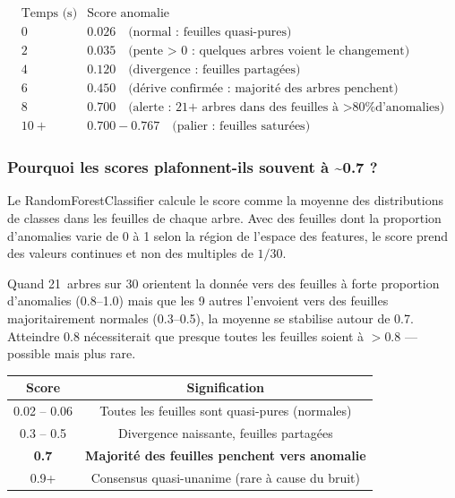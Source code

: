 \documentclass[12pt,a4paper]{article}
\begin{document}
\[
\begin{array}{c|c}
\text{Temps (s)} & \text{Score anomalie} \\ \hline
0 & 0.026 \quad \text{(normal : feuilles quasi-pures)} \\
2 & 0.035 \quad \text{(pente > 0 : quelques arbres voient le changement)} \\
4 & 0.120 \quad \text{(divergence : feuilles partagées)} \\
6 & 0.450 \quad \text{(dérive confirmée : majorité des arbres penchent)} \\
8 & 0.700 \quad \text{(alerte : 21+ arbres dans des feuilles à >80\% d'anomalies)} \\
10+ & 0.700-0.767 \quad \text{(palier : feuilles saturées)}
\end{array}
\]

\subsubsection{Pourquoi les scores plafonnent-ils souvent à \textasciitilde0.7 ?}

Le RandomForestClassifier calcule le score comme la moyenne des distributions de classes dans les feuilles de chaque arbre. Avec des feuilles dont la proportion d'anomalies varie de 0 à 1 selon la région de l'espace des features, le score prend des valeurs continues et non des multiples de $1/30$.

Quand 21~arbres sur 30 orientent la donnée vers des feuilles à forte proportion d'anomalies (0.8--1.0) mais que les 9 autres l'envoient vers des feuilles majoritairement normales (0.3--0.5), la moyenne se stabilise autour de 0.7. Atteindre 0.8 nécessiterait que presque toutes les feuilles soient à $>$0.8 — possible mais plus rare.

\begin{center}
\begin{tabular}{|c|c|}
\hline
\textbf{Score} & \textbf{Signification} \\
\hline
0.02 -- 0.06 & Toutes les feuilles sont quasi-pures (normales) \\
0.3 -- 0.5 & Divergence naissante, feuilles partagées \\
\textbf{0.7} & \textbf{Majorité des feuilles penchent vers anomalie} \\
0.9+ & Consensus quasi-unanime (rare à cause du bruit) \\
\hline
\end{tabular}
\end{center}
\end{document}

